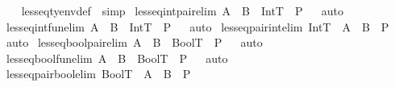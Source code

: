 \begin{isabellebody}
\isadelimproof
\ \ \endisadelimproof
\isatagproof
{}\isamarkupfalse \ lesseq{\isacharunderscore}tyenv{\isacharunderscore}def\ \isamarkupfalse \ simp\endisatagproof
{\isafoldproof}\isadelimproof
\isanewline
\endisadelimproof
\isanewline
{}\isamarkupfalse \ lesseq{\isacharunderscore}int{\isacharunderscore}pair{\isacharbrackleft}elim{\isacharbang}{\isacharbrackright}{\isacharcolon}\ {\isachardoublequoteopen}A\ {\isasymtimes}\ B\ {\isasymsqsubseteq}\ IntT\ {\isasymLongrightarrow}\ P{\isachardoublequoteclose}\isadelimproof
\ \endisadelimproof
\isatagproof
{}\isamarkupfalse \ auto\endisatagproof
{\isafoldproof}\isadelimproof
\endisadelimproof
\isanewline
{}\isamarkupfalse \ lesseq{\isacharunderscore}int{\isacharunderscore}fun{\isacharbrackleft}elim{\isacharbang}{\isacharbrackright}{\isacharcolon}\ {\isachardoublequoteopen}A\ {\isasymrightarrow}\ B\ {\isasymsqsubseteq}\ IntT\ {\isasymLongrightarrow}\ P{\isachardoublequoteclose}\isadelimproof
\ \endisadelimproof
\isatagproof
{}\isamarkupfalse \ auto\endisatagproof
{\isafoldproof}\isadelimproof
\endisadelimproof
\isanewline
{}\isamarkupfalse \ lesseq{\isacharunderscore}pair{\isacharunderscore}int{\isacharbrackleft}elim{\isacharbang}{\isacharbrackright}{\isacharcolon}\ {\isachardoublequoteopen}IntT\ {\isasymsqsubseteq}\ A\ {\isasymtimes}\ B\ {\isasymLongrightarrow}\ P{\isachardoublequoteclose}\isadelimproof
\ \endisadelimproof
\isatagproof
{}\isamarkupfalse \ auto\endisatagproof
{\isafoldproof}\isadelimproof
\endisadelimproof
\isanewline
{}\isamarkupfalse \ lesseq{\isacharunderscore}bool{\isacharunderscore}pair{\isacharbrackleft}elim{\isacharbang}{\isacharbrackright}{\isacharcolon}\ {\isachardoublequoteopen}A\ {\isasymtimes}\ B\ {\isasymsqsubseteq}\ BoolT\ {\isasymLongrightarrow}\ P{\isachardoublequoteclose}\isadelimproof
\ \endisadelimproof
\isatagproof
{}\isamarkupfalse \ auto\endisatagproof
{\isafoldproof}\isadelimproof
\endisadelimproof
\isanewline
{}\isamarkupfalse \ lesseq{\isacharunderscore}bool{\isacharunderscore}fun{\isacharbrackleft}elim{\isacharbang}{\isacharbrackright}{\isacharcolon}\ {\isachardoublequoteopen}A\ {\isasymrightarrow}\ B\ {\isasymsqsubseteq}\ BoolT\ {\isasymLongrightarrow}\ P{\isachardoublequoteclose}\isadelimproof
\ \endisadelimproof
\isatagproof
{}\isamarkupfalse \ auto\endisatagproof
{\isafoldproof}\isadelimproof
\endisadelimproof
\isanewline
{}\isamarkupfalse \ lesseq{\isacharunderscore}pair{\isacharunderscore}bool{\isacharbrackleft}elim{\isacharbang}{\isacharbrackright}{\isacharcolon}\ {\isachardoublequoteopen}BoolT\ {\isasymsqsubseteq}\ A\ {\isasymtimes}\ B\ {\isasymLongrightarrow}\ P{\isachardoublequoteclose}\isadelimproof

\end{isabellebody}
